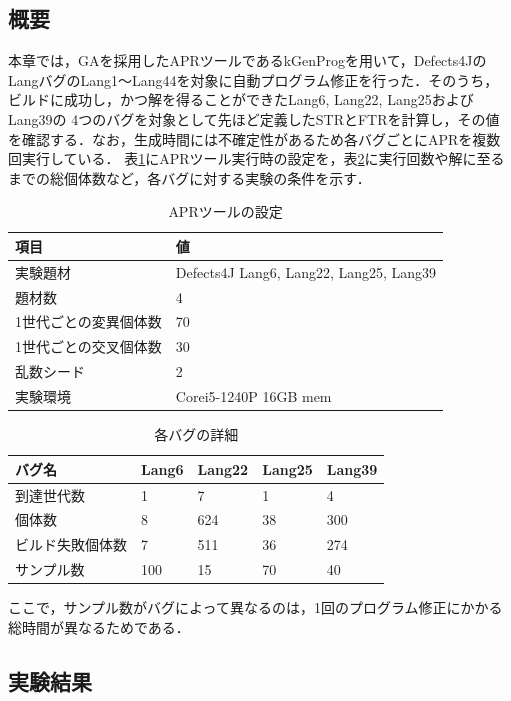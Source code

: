\documentclass[uplatex,dvipdfmx,a4paper]{jsarticle}
\let\oldcite\cite
\renewcommand{\cite}[1]{\xspace\oldcite{#1}}
\begin{document}
\subsection{概要}
本章では，GAを採用したAPRツールであるkGenProg\cite{higo2018kgenprog}を用いて，Defects4J\cite{just2014defects4j}のLangバグのLang1～Lang44を対象に自動プログラム修正を行った．そのうち，ビルドに成功し，かつ解を得ることができたLang6, 
 Lang22, Lang25およびLang39の
4つのバグを対象として先ほど定義したSTRとFTRを計算し，その値を確認する．なお，生成時間には不確定性があるため各バグごとにAPRを複数回実行している．
表\ref{tab:apr_setting}にAPRツール実行時の設定を，表\ref{tab:project_setting}に実行回数や解に至るまでの総個体数など，各バグに対する実験の条件を示す．
\begin{table}[b]
  \centering
  \caption{APRツールの設定}
  \label{tab:apr_setting}
  \begin{tabular}{ll} \hline\hline
    項目         & 値                           \\\hline
    実験題材     & Defects4J Lang6, Lang22, Lang25, Lang39 \\
    題材数       & 4                           \\
    1世代ごとの変異個体数 & 70 \\
    1世代ごとの交叉個体数 & 30 \\
    乱数シード   & 2       \\
    実験環境     & Corei5-1240P 16GB mem  \\\hline\hline
  \end{tabular}
\end{table}
\begin{table}[b]
  \centering
  \caption{各バグの詳細}
  \label{tab:project_setting}
  \begin{tabular}{lllll} \hline\hline
    バグ名 & Lang6 & Lang22 & Lang25 & Lang39  \\\hline
    到達世代数 & 1 & 7 & 1 & 4 \\
    個体数 & 8 & 624 & 38 & 300 \\
    ビルド失敗個体数 & 7 & 511 & 36 & 274 \\
    サンプル数 & 100 & 15 & 70 & 40 \\\hline\hline
  \end{tabular}
\end{table}
ここで，サンプル数がバグによって異なるのは，1回のプログラム修正にかかる総時間が異なるためである．
\subsection{実験結果}
\end{document}
